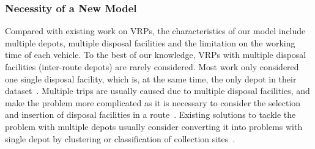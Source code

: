 \documentclass[journal]{IEEEtran}
\begin{document}

\subsubsection{Necessity of a New Model}\label{sec:discussmodel}

Compared with existing work on VRPs, the characteristics of our model include multiple depots, multiple disposal facilities and the limitation on the working time of each vehicle. To the best of our knowledge, VRPs with multiple disposal facilities (inter-route depots) are rarely considered. Most work only considered one single disposal facility, which is, at the same time, the only depot in their dataset~\cite{bautista2008solving,tang2017scalable,akhtar2017backtracking,mi2017optimization}. Multiple trips are usually caused due to multiple disposal facilities, and make the problem more complicated as it is necessary to consider the selection and insertion of disposal facilities in a route~\cite{kim2006waste,benjamin2010metaheuristics,buhrkal2012waste}. Existing solutions to tackle the problem with multiple depots usually consider converting it into problems with single depot by clustering or classification of collection sites~\cite{kim2006waste,shi2020heuristic}.
\end{document}
